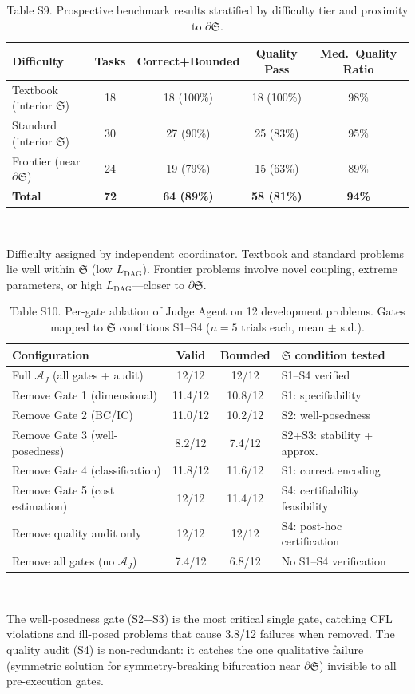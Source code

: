 \documentclass[11pt,a4paper]{article}
\newcommand{\Sclass}{\mathfrak{S}}
\newcommand{\Agent}{\mathcal{A}}
\begin{document}
\begin{table}[htbp]
\centering
\caption{Table S9. Prospective benchmark results stratified by difficulty tier and proximity to $\partial \Sclass$.}
\small
\begin{tabularx}{\textwidth}{Xcccc}
\toprule
\textbf{Difficulty} & \textbf{Tasks} & \textbf{Correct+Bounded} & \textbf{Quality Pass} & \textbf{Med.\ Quality Ratio} \\
\midrule
Textbook (interior $\Sclass$) & 18 & 18 (100\%) & 18 (100\%) & 98\% \\
Standard (interior $\Sclass$) & 30 & 27 (90\%) & 25 (83\%) & 95\% \\
Frontier (near $\partial \Sclass$) & 24 & 19 (79\%) & 15 (63\%) & 89\% \\
\midrule
\textbf{Total} & \textbf{72} & \textbf{64 (89\%)} & \textbf{58 (81\%)} & \textbf{94\%} \\
\bottomrule
\end{tabularx}\\[3pt]
\raggedright\scriptsize Difficulty assigned by independent coordinator. Textbook and standard problems lie well within $\Sclass$ (low $L_{\text{DAG}}$). Frontier problems involve novel coupling, extreme parameters, or high $L_{\text{DAG}}$---closer to $\partial \Sclass$.
\end{table}

\begin{table}[htbp]
\centering
\caption{Table S10. Per-gate ablation of Judge Agent on 12 development problems. Gates mapped to $\Sclass$ conditions S1--S4 ($n = 5$ trials each, mean $\pm$ s.d.).}
\small
\begin{tabularx}{\textwidth}{Xccl}
\toprule
\textbf{Configuration} & \textbf{Valid} & \textbf{Bounded} & \textbf{$\Sclass$ condition tested} \\
\midrule
Full $\Agent_J$ (all gates + audit) & 12/12 & 12/12 & S1--S4 verified \\
Remove Gate 1 (dimensional) & 11.4/12 & 10.8/12 & S1: specifiability \\
Remove Gate 2 (BC/IC) & 11.0/12 & 10.2/12 & S2: well-posedness \\
Remove Gate 3 (well-posedness) & 8.2/12 & 7.4/12 & S2+S3: stability + approx. \\
Remove Gate 4 (classification) & 11.8/12 & 11.6/12 & S1: correct encoding \\
Remove Gate 5 (cost estimation) & 12/12 & 11.4/12 & S4: certifiability feasibility \\
Remove quality audit only & 12/12 & 12/12 & S4: post-hoc certification \\
Remove all gates (no $\Agent_J$) & 7.4/12 & 6.8/12 & No S1--S4 verification \\
\bottomrule
\end{tabularx}\\[3pt]
\raggedright\scriptsize The well-posedness gate (S2+S3) is the most critical single gate, catching CFL violations and ill-posed problems that cause 3.8/12 failures when removed. The quality audit (S4) is non-redundant: it catches the one qualitative failure (symmetric solution for symmetry-breaking bifurcation near $\partial \Sclass$) invisible to all pre-execution gates.
\end{table}
\end{document}
